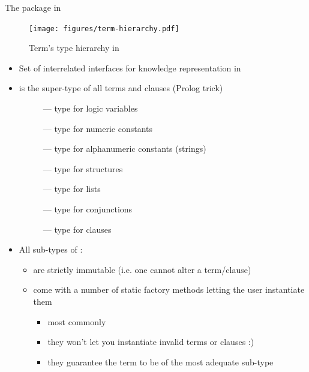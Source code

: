 \documentclass[presentation]{beamer}\mode<presentation>{\usetheme{AMSBolognaFC}}
\begin{document}
\begin{frame}[allowframebreaks]{The  package in }
    \begin{figure}
        \centering
        \texttt{[image: figures/term-hierarchy.pdf]}
        \caption{Term's type hierarchy in \twopkt{}}
        \label{fig:term-hierarchy}
    \end{figure}

    \framebreak

    \begin{itemize}
        \item Set of interrelated interfaces for knowledge representation in \twopkt{}

        \bigskip

        \item {} is the super-type of all terms and \alert{clauses} (Prolog trick)
        \begin{description}
            \item[] --- type for logic variables
            \item[] --- type for numeric constants
            \item[] --- type for alphanumeric constants (strings)
            \item[] --- type for structures
            \item[] --- type for lists
            \item[] --- type for conjunctions
            \item[] --- type for clauses
        \end{description}

        \framebreak

        \item All sub-types of :
        \begin{itemize}
            \item are strictly \alert{immutable} (i.e. one cannot alter a term/clause)
            \item come with a number of \alert{static factory} methods letting the user instantiate them
            \begin{itemize}
                \item most commonly 
                \item they won't let you instantiate invalid terms or clauses :)
                \item they guarantee the term to be of the \alert{most adequate} sub-type
            \end{itemize}
        \end{itemize}


\end{itemize}
\end{frame}
\end{document}
